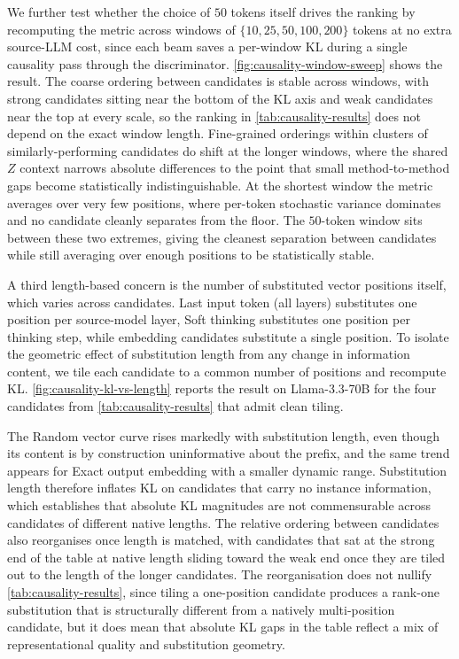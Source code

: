 

We further test whether the choice of $50$ tokens itself drives the ranking by recomputing the metric across windows of $\{10, 25, 50, 100, 200\}$ tokens at no extra source-LLM cost, since each beam saves a per-window KL during a single causality pass through the discriminator. \cref{fig:causality-window-sweep} shows the result. The coarse ordering between candidates is stable across windows, with strong candidates sitting near the bottom of the KL axis and weak candidates near the top at every scale, so the ranking in \cref{tab:causality-results} does not depend on the exact window length. Fine-grained orderings within clusters of similarly-performing candidates do shift at the longer windows, where the shared $Z$ context narrows absolute differences to the point that small method-to-method gaps become statistically indistinguishable. At the shortest window the metric averages over very few positions, where per-token stochastic variance dominates and no candidate cleanly separates from the floor. The $50$-token window sits between these two extremes, giving the cleanest separation between candidates while still averaging over enough positions to be statistically stable.



A third length-based concern is the number of substituted vector positions itself, which varies across candidates. Last input token (all layers) substitutes one position per source-model layer, Soft thinking substitutes one position per thinking step, while embedding candidates substitute a single position. To isolate the geometric effect of substitution length from any change in information content, we tile each candidate to a common number of positions and recompute KL. \cref{fig:causality-kl-vs-length} reports the result on Llama-3.3-70B for the four candidates from \cref{tab:causality-results} that admit clean tiling.

The Random vector curve rises markedly with substitution length, even though its content is by construction uninformative about the prefix, and the same trend appears for Exact output embedding with a smaller dynamic range. Substitution length therefore inflates KL on candidates that carry no instance information, which establishes that absolute KL magnitudes are not commensurable across candidates of different native lengths. The relative ordering between candidates also reorganises once length is matched, with candidates that sat at the strong end of the table at native length sliding toward the weak end once they are tiled out to the length of the longer candidates. The reorganisation does not nullify \cref{tab:causality-results}, since tiling a one-position candidate produces a rank-one substitution that is structurally different from a natively multi-position candidate, but it does mean that absolute KL gaps in the table reflect a mix of representational quality and substitution geometry.

